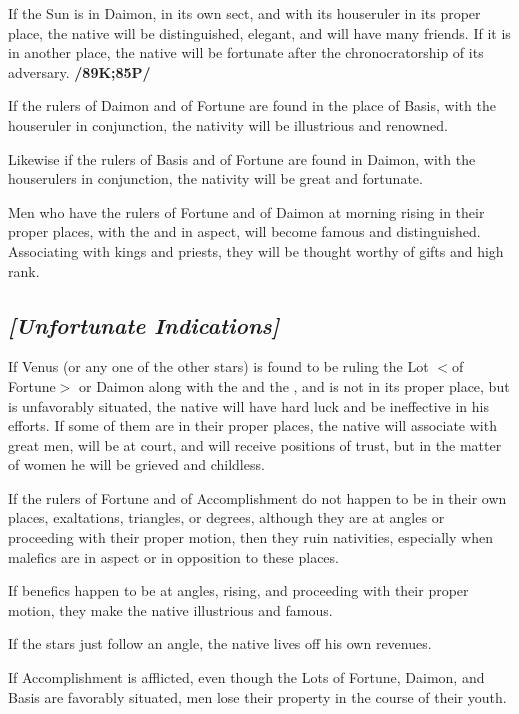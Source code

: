 If the Sun is in Daimon, in its own sect, and with its houseruler in its proper place, the native will be distinguished, elegant, and will have many friends. If it is in another place, the native will be fortunate after the chronocratorship of its adversary. \textbf{/89K;85P/}

If the rulers of Daimon and of Fortune are found in the place of Basis, with the houseruler in conjunction, the nativity will be illustrious and renowned. 

Likewise if the rulers of Basis and of Fortune are found in Daimon, with the houserulers in conjunction, the nativity will be great and fortunate. 

Men who have the rulers of Fortune and of Daimon at morning rising in their proper places, with the \Sun\xspace and \Moon\xspace in aspect, will become famous and distinguished. Associating with kings and priests, they will be thought worthy of gifts and high rank. 

\subsection{\textit{[Unfortunate Indications]}}
If Venus (or any one of the other stars) is found to be ruling the Lot $<$of Fortune$>$ or Daimon along with the \Sun\xspace and the \Moon, and is not in its proper place, but is unfavorably situated, the native will have hard luck and be ineffective in his efforts. If some of them are in their proper places, the native will associate with great men, will be at court, and will receive positions of trust, but in the matter of women he will be grieved and childless.

If the rulers of Fortune and of Accomplishment  do not happen to be in their own places, exaltations, triangles, or degrees, although they are at angles or proceeding with their proper motion, then they ruin nativities, especially when malefics are in aspect or in opposition to these places. 

If benefics happen to be at angles, rising, and proceeding with their proper motion, they make the native illustrious and famous. 

If the stars just follow an angle, the native lives off his own revenues.

If Accomplishment is afflicted, even though the Lots of Fortune, Daimon, and Basis are favorably situated, men lose their property in the course of their youth. 

